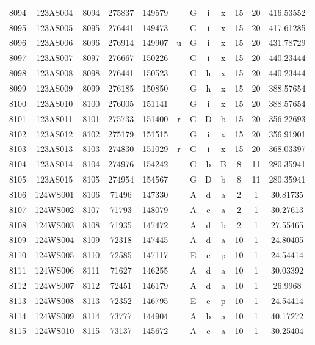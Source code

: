 \begin{tabular}{|*{12}{c|}}
8094 & 123AS004 & 8094 & 275837 & 149579 &  & G & i & x & 15 & 20 & 416.53552 \\ 
8095 & 123AS005 & 8095 & 276441 & 149473 &  & G & i & x & 15 & 20 & 417.61285 \\ 
8096 & 123AS006 & 8096 & 276914 & 149907 & u & G & i & x & 15 & 20 & 431.78729 \\ 
8097 & 123AS007 & 8097 & 276667 & 150226 &  & G & i & x & 15 & 20 & 440.23444 \\ 
8098 & 123AS008 & 8098 & 276441 & 150523 &  & G & h & x & 15 & 20 & 440.23444 \\ 
8099 & 123AS009 & 8099 & 276185 & 150850 &  & G & h & x & 15 & 20 & 388.57654 \\ 
8100 & 123AS010 & 8100 & 276005 & 151141 &  & G & i & x & 15 & 20 & 388.57654 \\ 
8101 & 123AS011 & 8101 & 275733 & 151400 & r & G & D & b & 15 & 20 & 356.22693 \\ 
8102 & 123AS012 & 8102 & 275179 & 151515 &  & G & i & x & 15 & 20 & 356.91901 \\ 
8103 & 123AS013 & 8103 & 274830 & 151029 & r & G & i & x & 15 & 20 & 368.03397 \\ 
8104 & 123AS014 & 8104 & 274976 & 154242 &  & G & b & B & 8 & 11 & 280.35941 \\ 
8105 & 123AS015 & 8105 & 274954 & 154567 &  & G & D & b & 8 & 11 & 280.35941 \\ 
8106 & 124WS001 & 8106 & 71496 & 147330 &  & A & d & a & 2 & 1 & 30.81735 \\ 
8107 & 124WS002 & 8107 & 71793 & 148079 &  & A & c & a & 2 & 1 & 30.27613 \\ 
8108 & 124WS003 & 8108 & 71935 & 147472 &  & A & d & b & 2 & 1 & 27.55465 \\ 
8109 & 124WS004 & 8109 & 72318 & 147445 &  & A & d & a & 10 & 1 & 24.80405 \\ 
8110 & 124WS005 & 8110 & 72585 & 147117 &  & E & e & p & 10 & 1 & 24.54414 \\ 
8111 & 124WS006 & 8111 & 71627 & 146255 &  & A & d & a & 10 & 1 & 30.03392 \\ 
8112 & 124WS007 & 8112 & 72451 & 146179 &  & A & d & a & 10 & 1 & 26.9968 \\ 
8113 & 124WS008 & 8113 & 72352 & 146795 &  & E & e & p & 10 & 1 & 24.54414 \\ 
8114 & 124WS009 & 8114 & 73777 & 144904 &  & A & b & a & 10 & 1 & 40.17272 \\ 
8115 & 124WS010 & 8115 & 73137 & 145672 &  & A & c & a & 10 & 1 & 30.25404 \\ 

\end{tabular}
